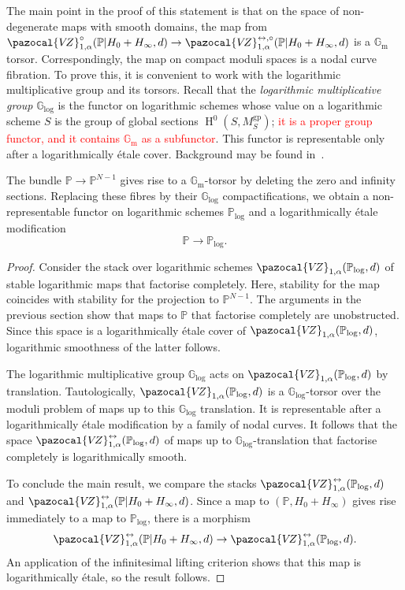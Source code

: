 \documentclass[11pt]{amsart}
\newcommand{\tred}{\textcolor{red}}
\newcommand{\VZ}{\pazocal{V\!Z}}
\renewcommand{\to}{\rightarrow}
\newcommand{\Gm}{\mathbb{G}_{\text{m}}}
\newcommand{\HH}{\operatorname{H}}
\newcommand{\Glog}{\mathbb{G}_{\mathrm{log}}}
\theoremstyle{definition}
\theoremstyle{definition}
\begin{document}
The main point in the proof of this statement is that on the space of non-degenerate maps with smooth domains, the map from $\VZ^\circ_{1,\alpha}(\mathbb P|H_0+H_\infty,d)\to \VZ^{\leftrightarrow,\circ}_{1,\alpha}(\mathbb P|H_0+H_\infty,d)$ is a $\mathbb G_{\operatorname{m}}$ torsor. Correspondingly, the map on compact moduli spaces is a nodal curve fibration. To prove this, it is convenient to work with the logarithmic multiplicative group and its torsors. Recall that the \textit{logarithmic multiplicative group} $\mathbb G_{\mathrm{log}}$ is the functor on logarithmic schemes whose value on a logarithmic scheme $S$ is the group of global sections $\HH^0(S,M_S^{\mathrm{gp}})$; \tred{it is a proper group functor, and it contains $\Gm$ as a subfunctor}. This functor is representable only after a logarithmically \'etale cover. Background may be found in~\cite{MW17,RW19}.

The bundle $\mathbb P\to \mathbb P^{N-1}$ gives rise to a $\mathbb G_{\operatorname{m}}$-torsor by deleting the zero and infinity sections. Replacing these fibres by their $\mathbb G_{\mathrm{log}}$ compactifications, we obtain a non-representable functor on logarithmic schemes $\mathbb P_{\mathrm{log}}$ and a logarithmically \'etale modification
\[
\mathbb P\to \mathbb P_{\mathrm{log}}.
\]

\begin{proof}
Consider the stack over logarithmic schemes $\VZ_{1,\alpha}(\mathbb P_{\mathrm{log}},d)$ of stable logarithmic maps that factorise completely. Here, stability for the map coincides with stability for the projection to $\mathbb P^{N-1}$. The arguments in the previous section show that maps to $\mathbb P$ that factorise completely are unobstructed. Since this space is a logarithmically \'etale cover of $\VZ_{1,\alpha}(\mathbb P_{\mathrm{log}},d)$, logarithmic smoothness of the latter follows.

The logarithmic multiplicative group $\mathbb G_{\mathrm{log}}$ acts on $\VZ_{1,\alpha}(\mathbb P_{\mathrm{log}},d)$ by translation. Tautologically, $\VZ_{1,\alpha}(\mathbb P_{\mathrm{log}},d)$ is a $\mathbb G_{\mathrm{log}}$-torsor over the moduli problem of maps up to this $\mathbb G_{\mathrm{log}}$ translation. It is representable after a logarithmically \'etale modification by a family of nodal curves. It follows that the space $\VZ^{\leftrightarrow}_{1,\alpha}(\mathbb P_{\mathrm{log}},d)$ of maps up to $\Glog$-translation that factorise completely is logarithmically smooth. 

To conclude the main result, we compare the stacks $\VZ^{\leftrightarrow}_{1,\alpha}(\mathbb P_{\mathrm{log}},d)$ and  $\VZ^{\leftrightarrow}_{1,\alpha}(\mathbb P|H_0+H_\infty,d)$. Since a map to $(\mathbb P,H_0+H_\infty)$ gives rise immediately to a map to $\mathbb P_{\mathrm{log}}$, there is a morphism
\[
\VZ^{\leftrightarrow}_{1,\alpha}(\mathbb P|H_0+H_\infty,d)\to \VZ^{\leftrightarrow}_{1,\alpha}(\mathbb P_{\mathrm{log}},d).
\]
An application of the infinitesimal lifting criterion shows that this map is logarithmically \'etale, so the result follows.
\end{proof}
\end{document}
